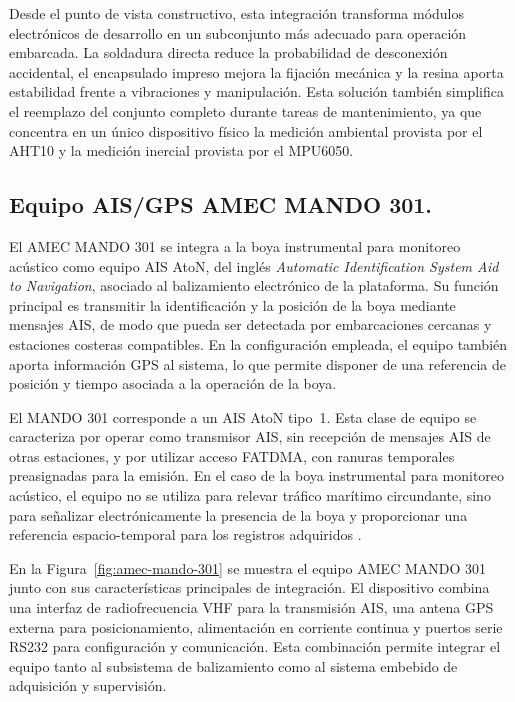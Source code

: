 Desde el punto de vista constructivo, esta integración transforma módulos electrónicos de desarrollo en un subconjunto más adecuado para operación embarcada. La soldadura directa reduce la probabilidad de desconexión accidental, el encapsulado impreso mejora la fijación mecánica y la resina aporta estabilidad frente a vibraciones y manipulación. Esta solución también simplifica el reemplazo del conjunto completo durante tareas de mantenimiento, ya que concentra en un único dispositivo físico la medición ambiental provista por el AHT10 y la medición inercial provista por el MPU6050.

\subsection{Equipo AIS/GPS AMEC MANDO 301.}

El AMEC MANDO 301 se integra a la boya instrumental para monitoreo acústico como equipo AIS AtoN, del inglés \emph{Automatic Identification System Aid to Navigation}, asociado al balizamiento electrónico de la plataforma. Su función principal es transmitir la identificación y la posición de la boya mediante mensajes AIS, de modo que pueda ser detectada por embarcaciones cercanas y estaciones costeras compatibles. En la configuración empleada, el equipo también aporta información GPS al sistema, lo que permite disponer de una referencia de posición y tiempo asociada a la operación de la boya.

El MANDO 301 corresponde a un AIS AtoN tipo~1. Esta clase de equipo se caracteriza por operar como transmisor AIS, sin recepción de mensajes AIS de otras estaciones, y por utilizar acceso FATDMA, con ranuras temporales preasignadas para la emisión. En el caso de la boya instrumental para monitoreo acústico, el equipo no se utiliza para relevar tráfico marítimo circundante, sino para señalizar electrónicamente la presencia de la boya y proporcionar una referencia espacio-temporal para los registros adquiridos \citep{AMECMando301Brochure}.

En la Figura~\ref{fig:amec-mando-301} se muestra el equipo AMEC MANDO 301 junto con sus características principales de integración. El dispositivo combina una interfaz de radiofrecuencia VHF para la transmisión AIS, una antena GPS externa para posicionamiento, alimentación en corriente continua y puertos serie RS232 para configuración y comunicación. Esta combinación permite integrar el equipo tanto al subsistema de balizamiento como al sistema embebido de adquisición y supervisión.

